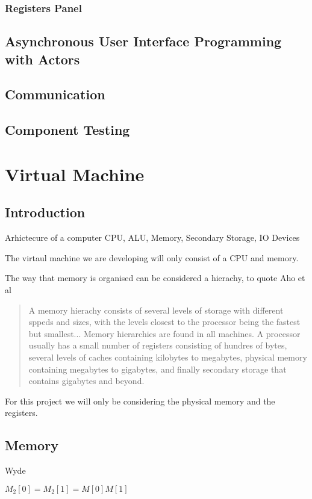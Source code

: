 \documentclass[a4paper,11pt]{report}
\begin{document}
\subsection{Registers Panel}
\section[Asynchronous UI Programming with Actors]{Asynchronous User Interface Programming with Actors}
\section{Communication}
\section{Component Testing}
\chapter{Virtual Machine}
\section{Introduction}
Arhictecure of a computer  %
CPU, ALU, Memory, Secondary Storage, IO Devices

The virtaul machine we are developing will only consist of a CPU and memory.

The way that memory is organised can be considered a hierachy, to quote Aho et al\cite{dragon}
\begin{quotation}
A memory hierachy consists of several levels of storage with different sppeds and sizes, with the levels closest to the processor being the fastest but smallest... Memory hierarchies are found in all machines. A processor usually has a small number of registers consisting of hundres of bytes, several levels of caches containing kilobytes to megabytes, physical memory containing megabytes to gigabytes, and finally secondary storage that contains gigabytes and beyond.
\end{quotation}
For this project we will only be considering the physical memory and the registers.

\section{Memory}
Wyde

\begin{math}
M_2[0] = M_2[1] = M[0]M[1]
\end{math}
\end{document}
